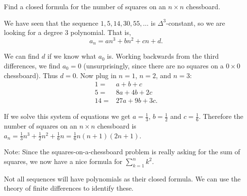 \documentclass[11pt,]{book}
\theoremstyle{ptxplainnotitle}
\theoremstyle{ptxplaintitle}
\theoremstyle{ptxdefinitionnotitle}
\theoremstyle{ptxdefinitiontitle}
\theoremstyle{ptxdefinitionnotitle}
\theoremstyle{ptxdefinitiontitle}
\theoremstyle{ptxdefinitionnotitle}
\theoremstyle{ptxdefinitiontitle}
\theoremstyle{ptxdefinitiontitlenonumber}
\theoremstyle{ptxdefinitiontitlenonumber}
\numberwithin{equation}{chapter}
\renewcommand{\d}{\displaystyle}
\newcommand{\amp}{&}
\begin{document}
\begin{example}\label{example-16}
\hypertarget{p-357}{}%
Find a closed formula for the number of squares on an \(n \times n\) chessboard.%
\par\smallskip%
\noindent\textbf{}\hypertarget{solution-47}{}\hypertarget{p-358}{}%
We have seen that the sequence \(1, 5, 14, 30, 55, \ldots\) is \(\Delta^3\)-constant, so we are looking for a degree 3 polynomial. That is,%
\begin{equation*}
a_n = an^3 + bn^2 + cn + d.
\end{equation*}
%
\par
\hypertarget{p-359}{}%
We can find \(d\) if we know what \(a_0\) is. Working backwards from the third differences, we find \(a_0 = 0\) (unsurprisingly, since there are no squares on a \(0\times 0\) chessboard). Thus \(d = 0\). Now plug in \(n = 1\), \(n =2\), and \(n =3\):%
\begin{align*}
1 = \amp a + b + c\\
5 = \amp 8a + 4b + 2c\\
14 = \amp 27a + 9b + 3c.
\end{align*}
%
\par
\hypertarget{p-360}{}%
If we solve this system of equations we get \(a = \frac{1}{3}\), \(b = \frac{1}{2}\) and \(c = \frac{1}{6}\). Therefore the number of squares on an \(n \times n\) chessboard is \(a_n = \frac{1}{3}n^3 + \frac{1}{2}n^2 + \frac{1}{6}n = \frac{1}{6}n(n+1)(2n+1)\).%
\end{example}
\hypertarget{p-361}{}%
Note: Since the squares-on-a-chessboard problem is really asking for the sum of squares, we now have a nice formula for \(\d\sum_{k=1}^n k^2\).%
\par
\hypertarget{p-362}{}%
Not all sequences will have polynomials as their closed formula. We can use the theory of finite differences to identify these.%
\end{document}

